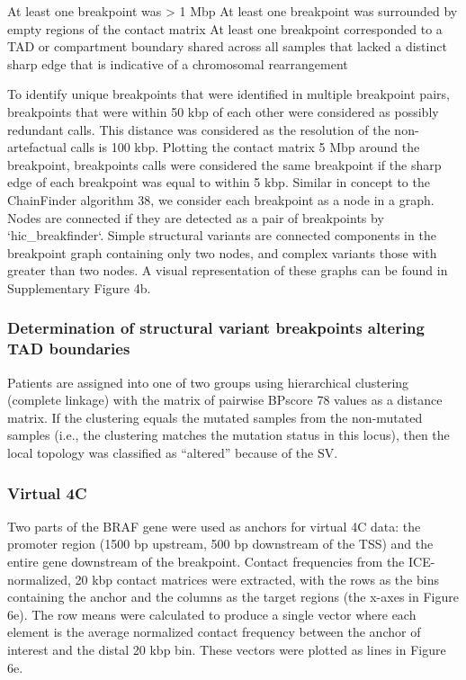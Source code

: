 At least one breakpoint was > 1 Mbp
At least one breakpoint was surrounded by empty regions of the contact matrix
At least one breakpoint corresponded to a TAD or compartment boundary shared across all samples that lacked a distinct sharp edge that is indicative of a chromosomal rearrangement

To identify unique breakpoints that were identified in multiple breakpoint pairs, breakpoints that were within 50 kbp of each other were considered as possibly redundant calls.
This distance was considered as the resolution of the non-artefactual calls is 100 kbp.
Plotting the contact matrix 5 Mbp around the breakpoint, breakpoints calls were considered the same breakpoint if the sharp edge of each breakpoint was equal to within 5 kbp.
Similar in concept to the ChainFinder algorithm 38, we consider each breakpoint as a node in a graph.
Nodes are connected if they are detected as a pair of breakpoints by `hic_breakfinder`.
Simple structural variants are connected components in the breakpoint graph containing only two nodes, and complex variants those with greater than two nodes.
A visual representation of these graphs can be found in Supplementary Figure 4b.

\subsubsection{Determination of structural variant breakpoints altering TAD boundaries}

Patients are assigned into one of two groups using hierarchical clustering (complete linkage) with the matrix of pairwise BPscore 78 values as a distance matrix.
If the clustering equals the mutated samples from the non-mutated samples (i.e., the clustering matches the mutation status in this locus), then the local topology was classified as “altered” because of the SV.

\subsubsection{Virtual 4C}
Two parts of the BRAF gene were used as anchors for virtual 4C data: the promoter region (1500 bp upstream, 500 bp downstream of the TSS) and the entire gene downstream of the breakpoint.
Contact frequencies from the ICE-normalized, 20 kbp contact matrices were extracted, with the rows as the bins containing the anchor and the columns as the target regions (the x-axes in Figure 6e).
The row means were calculated to produce a single vector where each element is the average normalized contact frequency between the anchor of interest and the distal 20 kbp bin.
These vectors were plotted as lines in Figure 6e.

